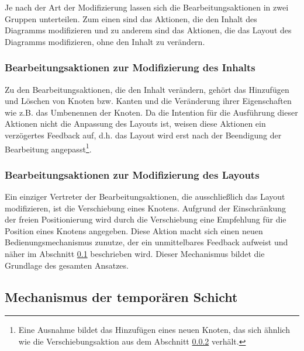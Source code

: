 Je nach der Art der Modifizierung lassen sich die Bearbeitungsaktionen in zwei Gruppen unterteilen. Zum einen sind das Aktionen, die den Inhalt des Diagramms modifizieren und zu anderem sind das Aktionen, die das Layout des Diagramms modifizieren, ohne den Inhalt zu verändern.

\subsubsection{Bearbeitungsaktionen zur Modifizierung des Inhalts}

Zu den Bearbeitungsaktionen, die den Inhalt verändern, gehört das Hinzufügen und Löschen von Knoten bzw. Kanten und die Veränderung ihrer Eigenschaften wie z.B. das Umbenennen der Knoten. Da die Intention für die Ausführung dieser Aktionen nicht die Anpassung des Layouts ist, weisen diese Aktionen ein verzögertes Feedback auf, d.h. das Layout wird erst nach der Beendigung der Bearbeitung angepasst\footnote{Eine Ausnahme bildet das Hinzufügen eines neuen Knoten, das sich ähnlich wie die Verschiebungsaktion aus dem Abschnitt \ref{subsubsec:edit-action-for-modifying-layout} verhält.}.

\subsubsection{Bearbeitungsaktionen zur Modifizierung des Layouts}
\label{subsubsec:edit-action-for-modifying-layout}

Ein einziger Vertreter der Bearbeitungsaktionen, die ausschließlich das Layout modifizieren, ist die Verschiebung eines Knotens. Aufgrund der Einschränkung der freien Positionierung wird durch die Verschiebung eine Empfehlung für die Position eines Knotens angegeben. Diese Aktion macht sich einen neuen Bedienungsmechanismus zunutze, der ein unmittelbares Feedback aufweist und näher im Abschnitt \ref{subsec:temporary-layer-mechanism} beschrieben wird. Dieser Mechanismus bildet die Grundlage des gesamten Ansatzes.

\subsection{Mechanismus der temporären Schicht}
\label{subsec:temporary-layer-mechanism}

